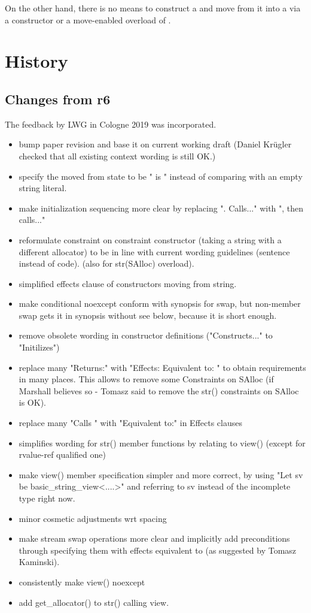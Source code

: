 \documentclass[ebook,11pt,article]{memoir}
\begin{document}
On the other hand, there is no means to construct a  and move from it into a  via a constructor or a move-enabled overload of .

\section{History}
\subsection{Changes from r6}
The feedback by LWG in Cologne 2019 was incorporated.
\begin{itemize}
\item bump paper revision and base it on current working draft  (Daniel Krügler checked that all existing context wording is still OK.)
\item specify the moved from state to be " is " instead of comparing with an empty string literal.
\item make initialization sequencing more clear by replacing ". Calls..." with ", then calls..."
\item reformulate constraint on constraint constructor (taking a string with a different allocator) to be in line with current wording guidelines (sentence instead of code). (also for str(SAlloc) overload).
\item simplified effects clause of constructors moving from string.
\item make conditional noexcept conform with synopsis for swap, but non-member swap gets it in synopsis without see below, because it is short enough.
\item remove obsolete wording in constructor definitions ("Constructs..." to "Initilizes")
\item replace many "Returns:" with "Effects: Equivalent to: " to obtain requirements in many places. This allows to remove some Constraints on SAlloc (if Marshall believes so - Tomasz said to remove the str() constraints on SAlloc is OK).
\item replace many "Calls " with "Equivalent to:" in Effects clauses
\item simplifies wording for str() member functions by relating to view() (except for rvalue-ref qualified one)
\item make view() member specification simpler and more correct, by using "Let sv be basic_string_view<....>" and referring to sv instead of the incomplete type right now.
\item minor cosmetic adjustments wrt spacing
\item make stream swap operations more clear and implicitly add preconditions through specifying them with effects equivalent to (as suggested by Tomasz Kaminski).
\item consistently make view() noexcept
\item add get_allocator() to str() calling view.
\end{itemize}
\end{document}
